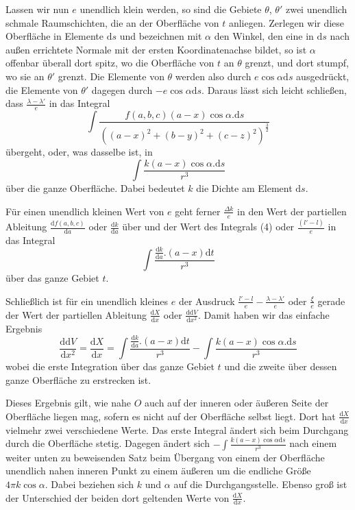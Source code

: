 Lassen wir nun $e$ unendlich klein werden, so sind die Gebiete $\theta$, $\theta'$ zwei unendlich schmale Raumschichten, die an der Oberfläche von $t$ anliegen. Zerlegen wir diese Oberfläche in Elemente $\mathrm{d}s$ und bezeichnen mit $\alpha$ den Winkel, den eine in $\mathrm{d}s$ nach außen errichtete Normale mit der ersten Koordinatenachse bildet, so ist $\alpha$ offenbar überall dort spitz, wo die Oberfläche von $t$ an $\theta$ grenzt, und dort stumpf, wo sie an $\theta'$ grenzt. Die Elemente von $\theta$ werden also durch $e\cos\alpha\mathrm{d}s$ ausgedrückt, die Elemente von $\theta'$ dagegen durch $-e\cos\alpha\mathrm{d}s$. Daraus lässt sich leicht schließen, dass $\frac{\lambda-\lambda'}{e}$ in das Integral
\[
\int\frac{f(a,b,c)(a-x)\cos\alpha.\mathrm{d}s}{((a-x)^2+(b-y)^2+(c-z)^2)^{\frac{3}{2}}}
\]
übergeht, oder, was dasselbe ist, in
\[
\int\frac{k(a-x)\cos\alpha.\mathrm{d}s}{r^3}
\]
über die ganze Oberfläche. Dabei bedeutet $k$ die Dichte am Element $\mathrm{d}s$.

Für einen unendlich kleinen Wert von $e$ geht ferner $\frac{\Delta k}{e}$ in den Wert der partiellen Ableitung $\frac{\mathrm{d}f(a,b,c)}{\mathrm{d}a}$ oder $\frac{\mathrm{d}k}{\mathrm{d}a}$ über und der Wert des Integrals (4) oder $\frac{(l'-l)}{e}$ in das Integral
%
\[
\int\frac{\frac{\mathrm{d}k}{\mathrm{d}a}.(a-x)\mathrm{d}t}{r^3}
\]
über das ganze Gebiet $t$.

Schließlich ist für ein unendlich kleines $e$ der Ausdruck $\frac{l'-l}{e}-\frac{\lambda-\lambda'}{e}$ oder $\frac{\xi}{e}$ gerade der Wert der partiellen Ableitung $\frac{\mathrm{d}X}{\mathrm{d}x}$ oder $\frac{\mathrm{d}\mathrm{d}V}{\mathrm{d}x^2}$. Damit haben wir das einfache Ergebnis
\[
\frac{\mathrm{d}\mathrm{d}V}{\mathrm{d}x^2}=\frac{\mathrm{d}X}{\mathrm{d}x}=\int\frac{\frac{\mathrm{d}k}{\mathrm{d}a}.(a-x)\mathrm{d}t}{r^3}-\int\frac{k(a-x)\cos\alpha.\mathrm{d}s}{r^3}
\]
wobei die erste Integration über das ganze Gebiet $t$ und die zweite über dessen ganze Oberfläche zu erstrecken ist.

Dieses Ergebnis gilt, wie nahe $O$ auch auf der inneren oder äußeren Seite der Oberfläche liegen mag, sofern es nicht auf der Oberfläche selbst liegt. Dort hat $\frac{\mathrm{d}X}{\mathrm{d}x}$ vielmehr zwei verschiedene Werte. Das erste Integral ändert sich beim Durchgang durch die Oberfläche stetig. Dagegen ändert sich $-\int\frac{k(a-x)\cos\alpha\mathrm{d}s}{r^3}$ nach einem weiter unten zu beweisenden Satz beim Übergang von einem der Oberfläche unendlich nahen inneren Punkt zu einem äußeren um die endliche Größe $4\pi k\cos\alpha$. Dabei beziehen sich $k$ und $\alpha$ auf die Durchgangsstelle. Ebenso groß ist der Unterschied der beiden dort geltenden Werte von $\frac{\mathrm{d}X}{\mathrm{d}x}$.

